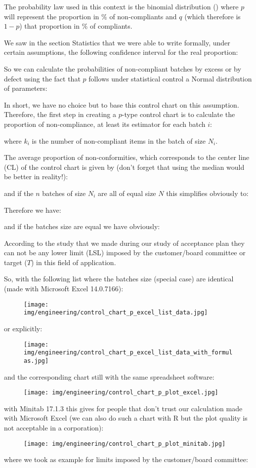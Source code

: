 	The probability law used in this context is the binomial distribution () where $p$ will represent the proportion in $\%$ of non-compliants and $q$ (which therefore is $1-p$) that proportion in $\%$ of compliants.

	We saw in the section Statistics that we were able to write formally, under certain assumptions, the following confidence interval for the real proportion:
	
	So we can calculate the probabilities of non-compliant batches by excess or by defect using the fact that $p$ follows under statistical control a Normal distribution of parameters:
	
	In short, we have no choice but to base this control chart on this assumption. Therefore, the first step in creating a $p$-type control chart is to calculate the proportion of non-compliance, at least its estimator for each batch $i$:
	
	where $k_i$ is the number of non-compliant items in the batch of size $N_i$.

	The average proportion of non-conformities, which corresponds to the center line (CL) of the control chart is given by (don't forget that using the median would be better in reality!):
	
	and if the $n$ batches of size $N_i$ are all of equal size $N$ this simplifies obviously to:
	
	Therefore we have:
	
	and if the batches size are equal  we have obviously:
	
	According to the study that we made during our study of acceptance plan they can not be any lower limit (LSL) imposed by the customer/board committee or target ($T$) in this field of application.

	So, with the following list where the batches size (special case) are identical (made with Microsoft Excel 14.0.7166):
	\begin{figure}[H]
		\centering
		\texttt{[image: img/engineering/control\_chart\_p\_excel\_list\_data.jpg]}
	\end{figure}
	or explicitly:
	\begin{figure}[H]
		\centering
		\texttt{[image: img/engineering/control\_chart\_p\_excel\_list\_data\_with\_formulas.jpg]}
	\end{figure}
	and the corresponding chart still with the same spreadsheet software:
	\begin{figure}[H]
		\centering
		\texttt{[image: img/engineering/control\_chart\_p\_plot\_excel.jpg]}
	\end{figure}
	with Minitab 17.1.3 this gives for people that don't trust our calculation made with Microsoft Excel (we can also do such a chart with R but the plot quality is not acceptable in a corporation):	
	\begin{figure}[H]
		\centering
		\texttt{[image: img/engineering/control\_chart\_p\_plot\_minitab.jpg]}
	\end{figure}
	where we took as example for limits imposed by the customer/board committee:
	
